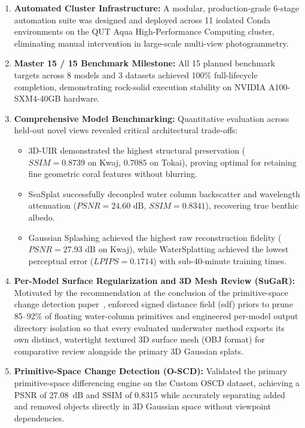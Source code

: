 \begin{enumerate}
    \item \textbf{Automated Cluster Infrastructure:} A modular, production-grade 6-stage automation suite was designed and deployed across 11 isolated Conda environments on the QUT Aqua High-Performance Computing cluster, eliminating manual intervention in large-scale multi-view photogrammetry.
    \item \textbf{Master 15 / 15 Benchmark Milestone:} All 15 planned benchmark targets across 8 models and 3 datasets achieved 100\% full-lifecycle completion, demonstrating rock-solid execution stability on NVIDIA A100-SXM4-40GB hardware.
    \item \textbf{Comprehensive Model Benchmarking:} Quantitative evaluation across held-out novel views revealed critical architectural trade-offs:
    \begin{itemize}
        \item 3D-UIR demonstrated the highest structural preservation ($SSIM = 0.8739$ on Kwaj, $0.7085$ on Tokai), proving optimal for retaining fine geometric coral features without blurring.
        \item SeaSplat successfully decoupled water column backscatter and wavelength attenuation ($PSNR = 24.60\text{ dB}$, $SSIM = 0.8341$), recovering true benthic albedo.
        \item Gaussian Splashing achieved the highest raw reconstruction fidelity ($PSNR = 27.93\text{ dB}$ on Kwaj), while WaterSplatting achieved the lowest perceptual error ($LPIPS = 0.1714$) with sub-40-minute training times.
    \end{itemize}
    \item \textbf{Per-Model Surface Regularization and 3D Mesh Review (SuGaR):} Motivated by the recommendation at the conclusion of the primitive-space change detection paper~\cite{galappaththige2026pixelsprimitivesscenechange}, enforced signed distance field (\gls{sdf}) priors to prune 85--92\% of floating water-column primitives and engineered per-model output directory isolation so that every evaluated underwater method exports its own distinct, watertight textured 3D surface mesh (OBJ format) for comparative review alongside the primary 3D Gaussian splats.
    \item \textbf{Primitive-Space Change Detection (O-SCD):} Validated the primary primitive-space differencing engine on the Custom OSCD dataset, achieving a PSNR of 27.08~dB and SSIM of 0.8315 while accurately separating added and removed objects directly in 3D Gaussian space without viewpoint dependencies.
\end{enumerate}

